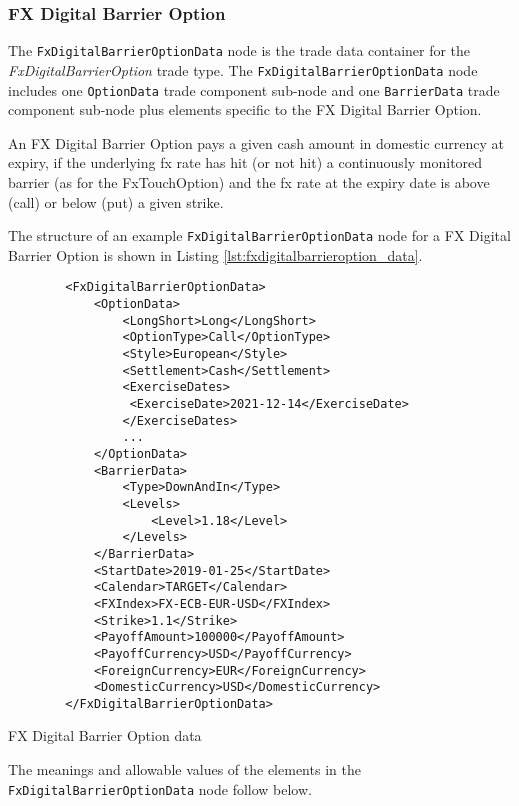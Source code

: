 \subsubsection{FX Digital Barrier Option}

The \lstinline!FxDigitalBarrierOptionData!  node is the trade data container for the \emph{FxDigitalBarrierOption} trade type.   The
\lstinline!FxDigitalBarrierOptionData!  node includes one  \lstinline!OptionData! trade component sub-node and one \lstinline!BarrierData! trade component sub-node plus elements
specific to the FX Digital Barrier Option. 

An FX Digital Barrier Option pays a given cash amount in domestic currency at expiry, if the underlying fx rate has hit (or not hit) a continuously monitored barrier (as for the FxTouchOption) and the fx rate at the expiry date is above (call) or below (put) a given strike.

The structure of an example \lstinline!FxDigitalBarrierOptionData! node for a FX Digital Barrier Option is shown in Listing
\ref{lst:fxdigitalbarrieroption_data}.

\begin{listing}[H]
\begin{verbatim}
        <FxDigitalBarrierOptionData>
            <OptionData>
                <LongShort>Long</LongShort>
                <OptionType>Call</OptionType>
                <Style>European</Style>
                <Settlement>Cash</Settlement>                
                <ExerciseDates>
                 <ExerciseDate>2021-12-14</ExerciseDate>
                </ExerciseDates> 
                ...
            </OptionData>
            <BarrierData>
                <Type>DownAndIn</Type>
                <Levels>
                    <Level>1.18</Level>
                </Levels>
            </BarrierData>
            <StartDate>2019-01-25</StartDate>
            <Calendar>TARGET</Calendar>
            <FXIndex>FX-ECB-EUR-USD</FXIndex>
            <Strike>1.1</Strike>
            <PayoffAmount>100000</PayoffAmount>
            <PayoffCurrency>USD</PayoffCurrency>            
            <ForeignCurrency>EUR</ForeignCurrency>
            <DomesticCurrency>USD</DomesticCurrency>
        </FxDigitalBarrierOptionData>
\end{verbatim}
\caption{FX Digital Barrier Option data}
\label{lst:fxdigitalbarrieroption_data}
\end{listing}

The meanings and allowable values of the elements in the \lstinline!FxDigitalBarrierOptionData!  node follow below.

